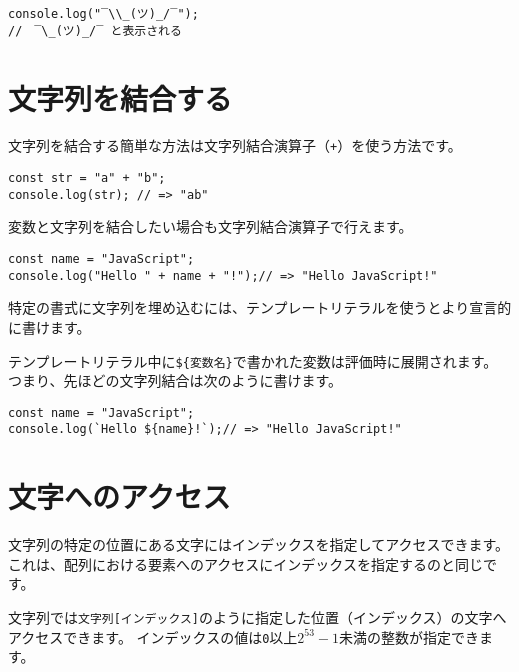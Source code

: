 \begin{lstlisting}
console.log("‾\\_(ツ)_/‾");
//　‾\_(ツ)_/‾ と表示される
\end{lstlisting}

\hypertarget{concat}{%
\section{文字列を結合する}\label{concat}}

文字列を結合する簡単な方法は文字列結合演算子（\texttt{+}）を使う方法です。

\begin{lstlisting}
const str = "a" + "b";
console.log(str); // => "ab"
\end{lstlisting}

変数と文字列を結合したい場合も文字列結合演算子で行えます。

\begin{lstlisting}
const name = "JavaScript";
console.log("Hello " + name + "!");// => "Hello JavaScript!"
\end{lstlisting}

特定の書式に文字列を埋め込むには、テンプレートリテラルを使うとより宣言的に書けます。

テンプレートリテラル中に\texttt{\$\{変数名\}}で書かれた変数は評価時に展開されます。
つまり、先ほどの文字列結合は次のように書けます。

\begin{lstlisting}
const name = "JavaScript";
console.log(`Hello ${name}!`);// => "Hello JavaScript!"
\end{lstlisting}

\hypertarget{get-char}{%
\section{文字へのアクセス}\label{get-char}}

文字列の特定の位置にある文字にはインデックスを指定してアクセスできます。
これは、配列における要素へのアクセスにインデックスを指定するのと同じです。

文字列では\texttt{文字列[インデックス]}のように指定した位置（インデックス）の文字へアクセスできます。
インデックスの値は\texttt{0}以上\texttt{$2^{53} - 1$}未満の整数が指定できます。

